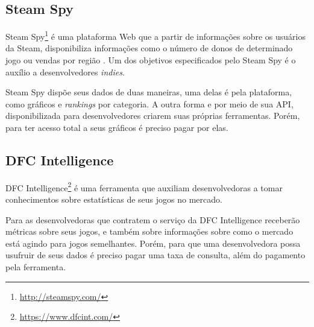 \subsection{Steam Spy}
Steam Spy\footnote[2]{\url{http://steamspy.com/}} é uma plataforma Web que a partir de informações sobre os usuários da Steam, disponibiliza informações como o número de donos de determinado jogo ou vendas por região \cite{steam_spy}. Um dos objetivos especificados pelo Steam Spy é o auxílio a desenvolvedores \textit{indies}.

Steam Spy dispõe seus dados de duas maneiras, uma delas é pela plataforma, como gráficos e \textit{rankings} por categoria. A outra forma e por meio de sua API, disponibilizada para desenvolvedores criarem suas próprias ferramentas. Porém, para ter acesso total a seus gráficos é preciso pagar por elas.

\subsection{DFC Intelligence}
DFC Intelligence\footnote[3]{\url{https://www.dfcint.com/}} é uma ferramenta que auxiliam desenvolvedoras a tomar conhecimentos sobre estatísticas de seus jogos no mercado.

Para as desenvolvedoras que contratem o serviço da DFC Intelligence receberão métricas sobre seus jogos, e também sobre informações sobre como o mercado está agindo para jogos semelhantes. Porém, para que uma desenvolvedora possa usufruir de seus dados é preciso pagar uma taxa de consulta, além do pagamento pela ferramenta.